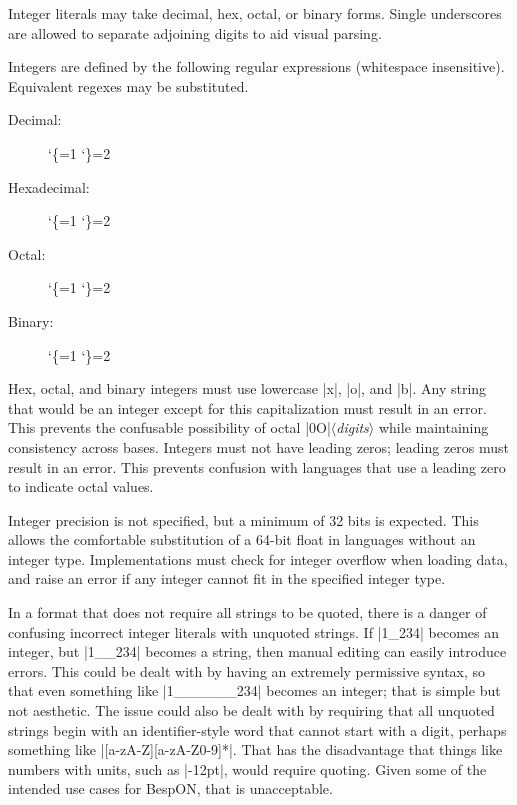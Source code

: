 \documentclass[11pt]{article}
\makeatletter
\newcommand{\bespon}{BespON}
\newcommand{\vmeta}[1]{{\color{DarkRed}\ensuremath{\langle}\textit{#1}\ensuremath{\rangle}}}
\newcommand{\lit}{%
  \begingroup
  \let\do\@makeother
  \dospecials
  \catcode`\{=1
  \catcode`\}=2
  \lit@i}
\def\lit@i#1{%
  \endgroup
  \texttt{\color{DarkRed}\detokenize{#1}}}
\makeatother
\begin{document}
Integer literals may take decimal, hex, octal, or binary forms.  Single underscores are allowed to separate adjoining digits to aid visual parsing.

Integers are defined by the following regular expressions (whitespace insensitive).  Equivalent regexes may be substituted.
\begin{description}
\item[Decimal:]  \lit{[+-]?[\x20\t]*(?: 0 | [1-9](?:_[0-9]|[0-9])*) $}
\item[Hexadecimal:]  \lit{[+-]?[\x20\t]*0x[0-9a-fA-F](?:_[0-9a-fA-F]|[0-9a-fA-F])*$}
\item[Octal:]  \lit{[+-]?[\x20\t]*0o[0-7](?:_[0-7]|[0-7])*$}
\item[Binary:]  \lit{[+-]?[\x20\t]*0b[01](?:_[01]|[01])*$}
\end{description} %
Hex, octal, and binary integers must use lowercase |x|, |o|, and |b|.  Any string that would be an integer except for this capitalization must result in an error.  This prevents the confusable possibility of octal |0O|\vmeta{digits} while maintaining consistency across bases.  Integers must not have leading zeros; leading zeros must result in an error.  This prevents confusion with languages that use a leading zero to indicate octal values.

Integer precision is not specified, but a minimum of 32 bits is expected.  This allows the comfortable substitution of a 64-bit float in languages without an integer type.  Implementations must check for integer overflow when loading data, and raise an error if any integer cannot fit in the specified integer type.

In a format that does not require all strings to be quoted, there is a danger of confusing incorrect integer literals with unquoted strings.  If |1_234| becomes an integer, but |1__234| becomes a string, then manual editing can easily introduce errors.  This could be dealt with by having an extremely permissive syntax, so that even something like |1______234| becomes an integer; that is simple but not aesthetic.  The issue could also be dealt with by requiring that all unquoted strings begin with an identifier-style word that cannot start with a digit, perhaps something like |[a-zA-Z][a-zA-Z0-9]*|.  That has the disadvantage that things like numbers with units, such as |-12pt|, would require quoting.  Given some of the intended use cases for \bespon, that is unacceptable.
\end{document}
